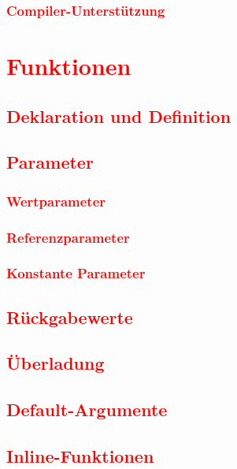 \subsection{\textcolor{red}{Compiler-Unterstützung}}\label{sec:compiler-support}

\cleardoublepage\chapter{\textcolor{red}{Funktionen}}\label{chap:functions}
\section{\textcolor{red}{Deklaration und Definition}}\label{sec:function-declaration-definition}
\section{\textcolor{red}{Parameter}}\label{sec:function-parameters}
\subsection{\textcolor{red}{Wertparameter}}\label{sec:value-parameters}
\subsection{\textcolor{red}{Referenzparameter}}\label{sec:reference-parameters}
\subsection{\textcolor{red}{Konstante Parameter}}\label{sec:const-parameters}
\section{\textcolor{red}{Rückgabewerte}}\label{sec:return-values}
\section{\textcolor{red}{Überladung}}\label{sec:function-overloading}
\section{\textcolor{red}{Default-Argumente}}\label{sec:default-arguments}
\section{\textcolor{red}{Inline-Funktionen}}\label{sec:inline-functions}
